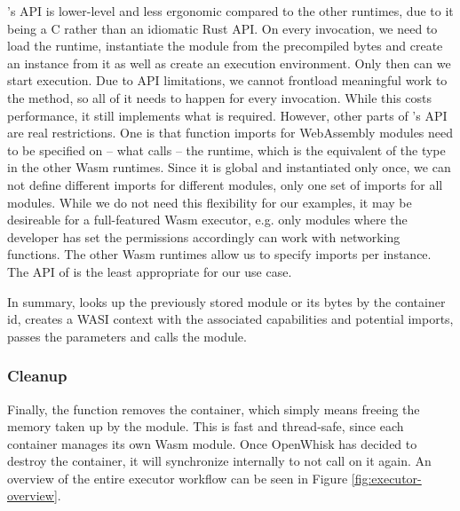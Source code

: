 \begin{description}[style=multiline, leftmargin=2.5cm, font=\bfseries]
    \item[Wamr] 's API is lower-level and less ergonomic compared to the other runtimes, due to it being a C rather than an idiomatic Rust API. On every  invocation, we need to load the runtime, instantiate the module from the precompiled bytes and create an instance from it as well as create an execution environment. Only then can we start execution. Due to API limitations, we cannot frontload meaningful work to the  method, so all of it needs to happen for every invocation.
    While this costs performance, it still implements what is required. However, other parts of 's API are real restrictions. One is that function imports for WebAssembly modules need to be specified on -- what  calls -- the runtime, which is the equivalent of the  type in the other Wasm runtimes. Since it is global and instantiated only once, we can not define different imports for different modules, only one set of imports for all modules. While we do not need this flexibility for our examples, it may be desireable for a full-featured Wasm executor, e.g. only modules where the developer has set the permissions accordingly can work with networking functions. The other Wasm runtimes allow us to specify imports per instance. The API of  is the least appropriate for our use case.

\end{description}

In summary,  looks up the previously stored module or its bytes by the container id, creates a WASI context with the associated capabilities and potential imports, passes the parameters and calls the module.


\subsubsection{Cleanup}
Finally, the  function removes the container, which simply means freeing the memory taken up by the module. This is fast and thread-safe, since each container manages its own Wasm module. Once OpenWhisk has decided to destroy the container, it will synchronize internally to not call  on it again. An overview of the entire executor workflow can be seen in Figure \ref{fig:executor-overview}.

